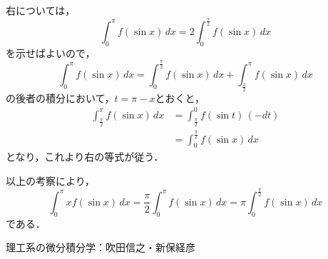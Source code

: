\documentclass[uplatex,dvipdfmx,a4paper,10pt,fleqn]{jsarticle}
\begin{document}
右については，
\[
    \int_{0}^{\pi} f(\sin x)\, dx =2 \int_{0}^{\frac{\pi}{2}} f(\sin x) \, dx 
\]
を示せばよいので，
\[
    \int_{0}^{\pi} f(\sin x)\, dx = \int_{0}^{\frac{\pi}{2}} f(\sin x) \, dx + \int_{\frac{\pi}{2}}^{\pi} f(\sin x)\, dx 
\]
の後者の積分において，$ t = \pi -x$とおくと，
\begin{align*}
    \int_{\frac{\pi}{2}}^{\pi} f(\sin x)\, dx &= \int_{\frac{\pi}{2}}^{0} f (\sin t)\, (-dt) \\
    & = \int_{0}^{\frac{\pi}{2}} f (\sin x)\, dx
\end{align*}
となり，これより右の等式が従う．

以上の考察により，
\[
    \int_{0}^{\pi}x f(\sin x)\, dx=\frac{\pi}{2} \int_{0}^{\pi} f(\sin x)\, dx =\pi \int_{0}^{\frac{\pi}{2}} f(\sin x) \, dx 
\]
である．

\begin{thebibliography}{9}
	 理工系の微分積分学：吹田信之・新保経彦
\end{thebibliography}
\end{document}
